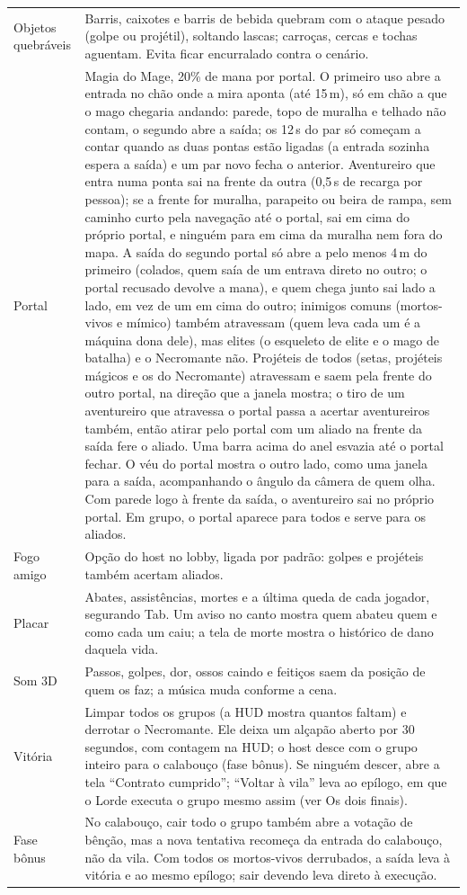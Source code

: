 \documentclass[11pt,a4paper]{article}
\begin{document}
\begin{xltabular}{\textwidth}{@{}lX@{}}
Objetos quebráveis & Barris, caixotes e barris de bebida quebram com o ataque pesado (golpe ou projétil), soltando lascas; carroças, cercas e tochas aguentam. Evita ficar encurralado contra o cenário. \\
Portal & Magia do Mage, 20\% de mana por portal. O primeiro uso abre a entrada no chão onde a mira aponta (até 15\,m), só em chão a que o mago chegaria andando: parede, topo de muralha e telhado não contam, o segundo abre a saída; os 12\,s do par só começam a contar quando as duas pontas estão ligadas (a entrada sozinha espera a saída) e um par novo fecha o anterior. Aventureiro que entra numa ponta sai na frente da outra (0,5\,s de recarga por pessoa); se a frente for muralha, parapeito ou beira de rampa, sem caminho curto pela navegação até o portal, sai em cima do próprio portal, e ninguém para em cima da muralha nem fora do mapa. A saída do segundo portal só abre a pelo menos 4\,m do primeiro (colados, quem saía de um entrava direto no outro; o portal recusado devolve a mana), e quem chega junto sai lado a lado, em vez de um em cima do outro; inimigos comuns (mortos-vivos e mímico) também atravessam (quem leva cada um é a máquina dona dele), mas elites (o esqueleto de elite e o mago de batalha) e o Necromante não. Projéteis de todos (setas, projéteis mágicos e os do Necromante) atravessam e saem pela frente do outro portal, na direção que a janela mostra; o tiro de um aventureiro que atravessa o portal passa a acertar aventureiros também, então atirar pelo portal com um aliado na frente da saída fere o aliado. Uma barra acima do anel esvazia até o portal fechar. O véu do portal mostra o outro lado, como uma janela para a saída, acompanhando o ângulo da câmera de quem olha. Com parede logo à frente da saída, o aventureiro sai no próprio portal. Em grupo, o portal aparece para todos e serve para os aliados. \\
Fogo amigo & Opção do host no lobby, ligada por padrão: golpes e projéteis também acertam aliados. \\
Placar & Abates, assistências, mortes e a última queda de cada jogador, segurando Tab. Um aviso no canto mostra quem abateu quem e como cada um caiu; a tela de morte mostra o histórico de dano daquela vida. \\
Som 3D & Passos, golpes, dor, ossos caindo e feitiços saem da posição de quem os faz; a música muda conforme a cena. \\
Vitória & Limpar todos os grupos (a HUD mostra quantos faltam) e derrotar o Necromante. Ele deixa um alçapão aberto por 30 segundos, com contagem na HUD; o host desce com o grupo inteiro para o calabouço (fase bônus). Se ninguém descer, abre a tela ``Contrato cumprido''; ``Voltar à vila'' leva ao epílogo, em que o Lorde executa o grupo mesmo assim (ver Os dois finais). \\
Fase bônus & No calabouço, cair todo o grupo também abre a votação de bênção, mas a nova tentativa recomeça da entrada do calabouço, não da vila. Com todos os mortos-vivos derrubados, a saída leva à vitória e ao mesmo epílogo; sair devendo leva direto à execução. \\
\bottomrule
\end{xltabular}
\end{document}

